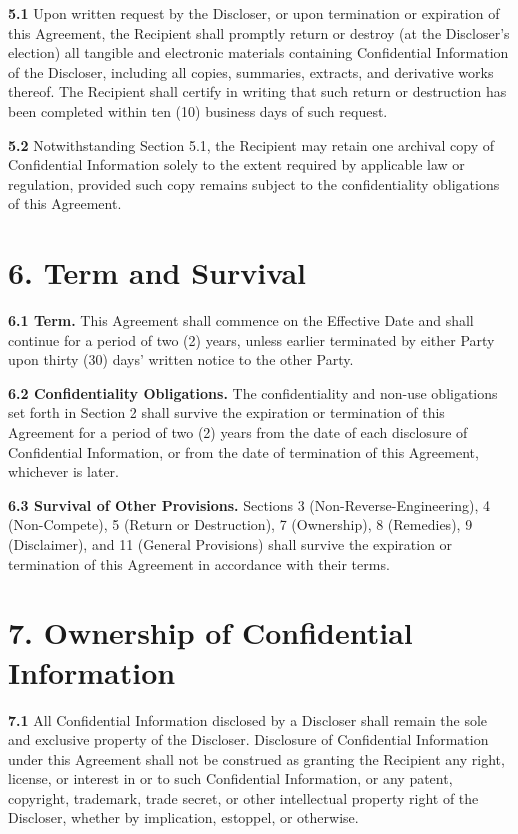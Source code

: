\documentclass{article}
\begin{document}
\textbf{5.1} Upon written request by the Discloser, or upon termination or expiration of this Agreement, the Recipient shall promptly return or destroy (at the Discloser's election) all tangible and electronic materials containing Confidential Information of the Discloser, including all copies, summaries, extracts, and derivative works thereof. The Recipient shall certify in writing that such return or destruction has been completed within ten (10) business days of such request.

\textbf{5.2} Notwithstanding Section 5.1, the Recipient may retain one archival copy of Confidential Information solely to the extent required by applicable law or regulation, provided such copy remains subject to the confidentiality obligations of this Agreement.

\section{6. Term and Survival}

\textbf{6.1 Term.} This Agreement shall commence on the Effective Date and shall continue for a period of two (2) years, unless earlier terminated by either Party upon thirty (30) days' written notice to the other Party.

\textbf{6.2 Confidentiality Obligations.} The confidentiality and non-use obligations set forth in Section 2 shall survive the expiration or termination of this Agreement for a period of two (2) years from the date of each disclosure of Confidential Information, or from the date of termination of this Agreement, whichever is later.

\textbf{6.3 Survival of Other Provisions.} Sections 3 (Non-Reverse-Engineering), 4 (Non-Compete), 5 (Return or Destruction), 7 (Ownership), 8 (Remedies), 9 (Disclaimer), and 11 (General Provisions) shall survive the expiration or termination of this Agreement in accordance with their terms.

\section{7. Ownership of Confidential Information}

\textbf{7.1} All Confidential Information disclosed by a Discloser shall remain the sole and exclusive property of the Discloser. Disclosure of Confidential Information under this Agreement shall not be construed as granting the Recipient any right, license, or interest in or to such Confidential Information, or any patent, copyright, trademark, trade secret, or other intellectual property right of the Discloser, whether by implication, estoppel, or otherwise.
\end{document}
